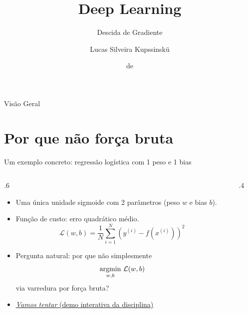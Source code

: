 \documentclass[aspectratio=169,xcolor=dvipsnames]{beamer}
\title{Deep Learning}
\subtitle{Descida de Gradiente}
\author{Lucas Silveira Kupssinskü}
\institute
{
    Machine Learning Theory and Applications Laboratory \\
    PUCRS
}
\date{\mespor de \the\year}
\begin{document}
  \begin{frame}
    \titlepage
  \end{frame}

  \begin{frame}{Visão Geral}
    \tableofcontents
  \end{frame}

  \section{Por que não força bruta}

  \begin{frame}{Um exemplo concreto: regressão logística com 1 peso e 1 bias}
    \begin{columns}
      \begin{column}{.6\linewidth}
        \begin{itemize}
          \item Uma única unidade sigmoide com 2 parâmetros (peso $w$ e bias $b$).
          \item Função de custo: erro quadrático médio.
          \[
            \mathcal{L}(w,b)=\frac{1}{N}\sum_{i=1}^{N}\left(y^{(i)}-f(x^{(i)})\right)^{2}
          \]
          \item Pergunta natural: por que não simplesmente
            \[
              \operatorname*{argmin}_{w,b}\,\mathcal{L}(w,b)
            \]
            via varredura por força bruta?
          \item \href{https://lucaskup.github.io/deep-learning-course/gradient-descent/\#s1}{%
              \textit{\color{blue}\underline{Vamos tentar}} (demo interativa da disciplina)}
        \end{itemize}
      \end{column}
      \begin{column}{.4\linewidth}
        \centering
      \end{column}
    \end{columns}
  \end{frame}
\end{document}
